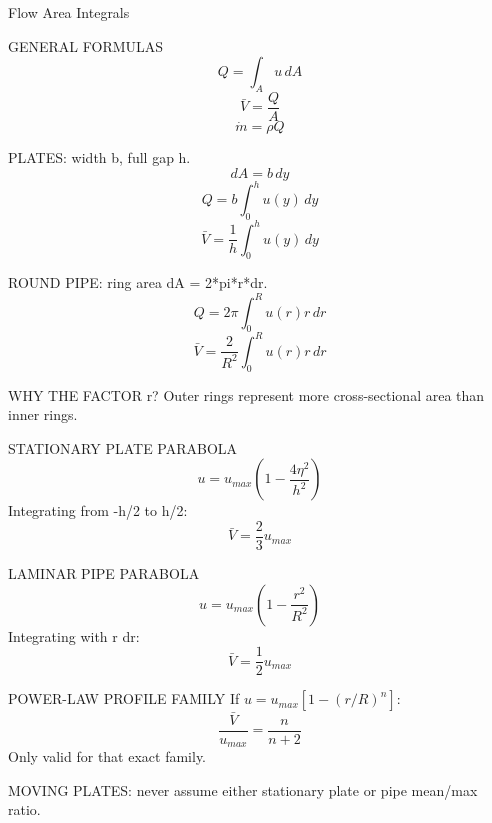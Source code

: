 Flow Area Integrals

GENERAL FORMULAS
$$Q=\int_Au\,dA$$
$$\bar V=\frac{Q}{A}$$
$$\dot m=\rho Q$$

PLATES: width b, full gap h.
$$dA=b\,dy$$
$$Q=b\int_0^h u(y)\,dy$$
$$\bar V=\frac{1}{h}\int_0^h u(y)\,dy$$

ROUND PIPE: ring area dA = 2*pi*r*dr.
$$Q=2\pi\int_0^R u(r)r\,dr$$
$$\bar V=\frac{2}{R^2}\int_0^R u(r)r\,dr$$

WHY THE FACTOR r?
Outer rings represent more cross-sectional area than inner rings.

STATIONARY PLATE PARABOLA
$$u=u_{max}(1-\frac{4\eta^2}{h^2})$$
Integrating from -h/2 to h/2:
$$\bar V=\frac{2}{3}u_{max}$$

LAMINAR PIPE PARABOLA
$$u=u_{max}(1-\frac{r^2}{R^2})$$
Integrating with r dr:
$$\bar V=\frac{1}{2}u_{max}$$

POWER-LAW PROFILE FAMILY
If $u=u_{max}[1-(r/R)^n]$:
$$\frac{\bar V}{u_{max}}=\frac{n}{n+2}$$
Only valid for that exact family.

MOVING PLATES: never assume either stationary plate or pipe mean/max ratio.
